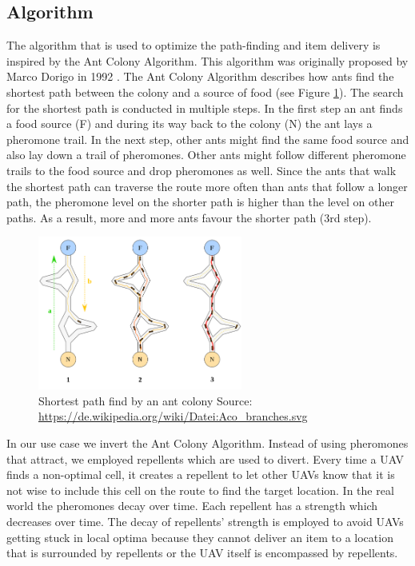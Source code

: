 \subsection{Algorithm}

The algorithm that is used to optimize the path-finding and item delivery is inspired by the Ant Colony Algorithm. This algorithm was originally proposed by Marco Dorigo in 1992 \cite{dorigo.1992}. The Ant Colony Algorithm describes how ants find the shortest path between the colony and a source of food (see Figure \ref{fig:algo_dreo.2016}). The search for the shortest path is conducted in multiple steps. In the first step an ant finds a food source (F) and during its way back to the colony (N) the ant lays a pheromone trail. In the next step, other ants might find the same food source and also lay down a trail of pheromones. Other ants might follow different pheromone trails to the food source and drop pheromones as well. Since the ants that walk the shortest path can traverse the route more often than ants that follow a longer path, the pheromone level on the shorter path is higher than the level on other paths. As a result, more and more ants favour the shorter path (3rd step).\\

\begin{figure}[htbp]\label{fig:algo_dreo.2016}
	\centering
	\includegraphics[width=0.6\textwidth]{images/algorithm_Picture1.png}
	\caption{Shortest path find by an ant colony Source: \url{https://de.wikipedia.org/wiki/Datei:Aco_branches.svg}} 

\end{figure}


In our use case we invert the Ant Colony Algorithm. Instead of using pheromones that attract, we employed repellents which are used to divert. Every time a UAV finds a non-optimal cell, it creates a repellent to let other UAVs know that it is not wise to include this cell on the route to find the target location. In the real world the pheromones decay over time. Each repellent has a strength which decreases over time.
The decay of repellents' strength is employed to avoid UAVs getting stuck in local optima because they cannot deliver an item to a location that is surrounded by repellents or the UAV itself is encompassed by repellents.\\

